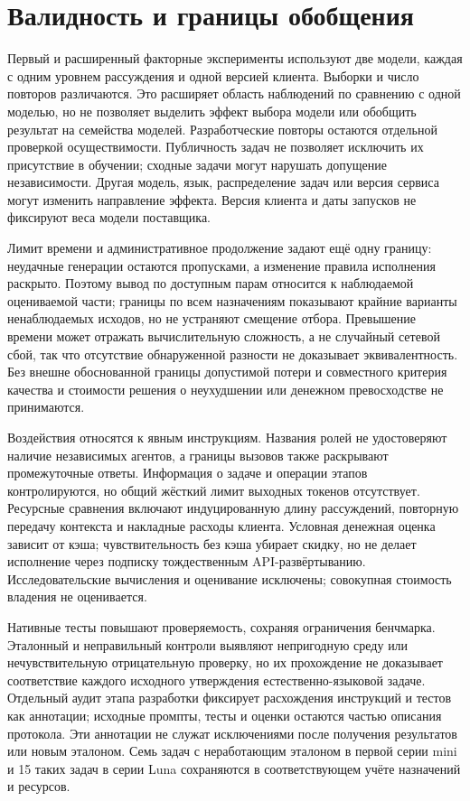 \section{Валидность и границы обобщения}
\label{sec:heldout-limits}
Первый и расширенный факторные эксперименты используют две модели, каждая с одним уровнем рассуждения и одной версией клиента. Выборки и число повторов различаются. Это расширяет область наблюдений по сравнению с одной моделью, но не позволяет выделить эффект выбора модели или обобщить результат на семейства моделей. Разработческие повторы остаются отдельной проверкой осуществимости. Публичность задач не позволяет исключить их присутствие в обучении; сходные задачи могут нарушать допущение независимости. Другая модель, язык, распределение задач или версия сервиса могут изменить направление эффекта. Версия клиента и даты запусков не фиксируют веса модели поставщика.

Лимит времени и административное продолжение задают ещё одну границу: неудачные генерации остаются пропусками, а изменение правила исполнения раскрыто. Поэтому вывод по доступным парам относится к наблюдаемой оцениваемой части; границы по всем назначениям показывают крайние варианты ненаблюдаемых исходов, но не устраняют смещение отбора. Превышение времени может отражать вычислительную сложность, а не случайный сетевой сбой, так что отсутствие обнаруженной разности не доказывает эквивалентность. Без внешне обоснованной границы допустимой потери и совместного критерия качества и стоимости решения о неухудшении или денежном превосходстве не принимаются.

Воздействия относятся к явным инструкциям. Названия ролей не удостоверяют наличие независимых агентов, а границы вызовов также раскрывают промежуточные ответы. Информация о задаче и операции этапов контролируются, но общий жёсткий лимит выходных токенов отсутствует. Ресурсные сравнения включают индуцированную длину рассуждений, повторную передачу контекста и накладные расходы клиента. Условная денежная оценка зависит от кэша; чувствительность без кэша убирает скидку, но не делает исполнение через подписку тождественным API-развёртыванию. Исследовательские вычисления и оценивание исключены; совокупная стоимость владения не оценивается.

Нативные тесты повышают проверяемость, сохраняя ограничения бенчмарка. Эталонный и неправильный контроли выявляют непригодную среду или нечувствительную отрицательную проверку, но их прохождение не доказывает соответствие каждого исходного утверждения естественно-языковой задаче. Отдельный аудит этапа разработки фиксирует расхождения инструкций и тестов как аннотации; исходные промпты, тесты и оценки остаются частью описания протокола. Эти аннотации не служат исключениями после получения результатов или новым эталоном. Семь задач с неработающим эталоном в первой серии mini и 15 таких задач в серии Luna сохраняются в соответствующем учёте назначений и ресурсов.


